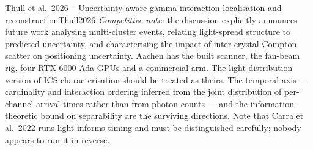 \begin{papernote}{Thull et al.\ 2026 -- Uncertainty-aware gamma interaction localisation and reconstruction}{Thull2026}
\emph{Competitive note:} the discussion explicitly announces future work analysing
multi-cluster events, relating light-spread structure to predicted uncertainty, and
characterising the impact of inter-crystal Compton scatter on positioning uncertainty.
Aachen has the built scanner, the fan-beam rig, four RTX 6000 Ada GPUs and a commercial
arm. The light-distribution version of ICS characterisation should be treated as theirs.
The temporal axis --- cardinality and interaction ordering inferred from the joint
distribution of per-channel arrival times rather than from photon counts --- and the
information-theoretic bound on separability are the surviving directions. Note that
Carra et al.\ 2022 runs light-informs-timing and must be distinguished carefully; nobody
appears to run it in reverse.
\end{papernote}